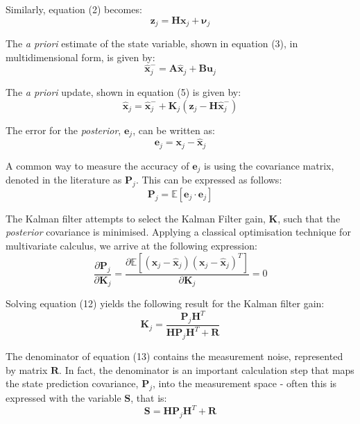 \documentclass[a4paper]{article}
\begin{document}
Similarly, equation (2) becomes:
\begin{equation}
\mathbf{z}_j = \mathbf{H} \mathbf{x}_j + \boldsymbol{\nu}_j
\end{equation}

The \textit{a priori} estimate of the state variable, shown in equation (3), in multidimensional form, is given by:
\begin{equation}
\hat{\mathbf{x}}^-_j = \mathbf{A} \hat{\mathbf{x}}_j + \mathbf{B} \mathbf{u}_j
\end{equation}

The \textit{a priori} update, shown in equation (5) is given by:
\begin{equation}
\hat{\mathbf{x}}_j = \hat{\mathbf{x}}^-_j + \mathbf{K}_j (\mathbf{z}_j - \mathbf{H} \hat{\mathbf{x}}^-_j)
\end{equation}

The error for the \textit{posterior}, $\mathbf{e}_j$, can be written as:
\begin{equation}
\mathbf{e}_j = \mathbf{x}_j - \hat{\mathbf{x}}_j
\end{equation}

A common way to measure the accuracy of $\mathbf{e}_j$ is using the covariance matrix, denoted in the literature as $\mathbf{P}_j$. This can be expressed as follows:
\begin{equation}
\mathbf{P}_j = \mathbb{E}[\mathbf{e}_j \cdot \mathbf{e}_j]
\end{equation}

The Kalman filter attempts to select the Kalman Filter gain, $\mathbf{K}$, such that the \textit{posterior} covariance is minimised. Applying a classical optimisation technique for multivariate calculus, we arrive at the following expression:
\begin{equation}
\frac{\partial \mathbf{P}_j}{\partial \mathbf{K}_j} = \frac{\partial \mathbb{E}[(\mathbf{x}_j - \hat{\mathbf{x}}_j)(\mathbf{x}_j - \hat{\mathbf{x}}_j)^T]}{\partial \mathbf{K}_j} = 0
\end{equation}

Solving equation (12) yields the following result for the Kalman filter gain:
\begin{equation}
\mathbf{K}_j = \frac{\mathbf{P}_j \mathbf{H}^T}{\mathbf{H} \mathbf{P}_j \mathbf{H}^T + \mathbf{R}}
\end{equation}

The denominator of equation (13) contains the measurement noise, represented by matrix $\mathbf{R}$. In fact, the denominator is an important calculation step that maps the state prediction covariance, $\mathbf{P}_j$, into the measurement space - often this is expressed with the variable $\mathbf{S}$, that is:
\begin{equation}
\mathbf{S} = \mathbf{H} \mathbf{P}_j \mathbf{H}^T + \mathbf{R} 
\end{equation}
\end{document}
